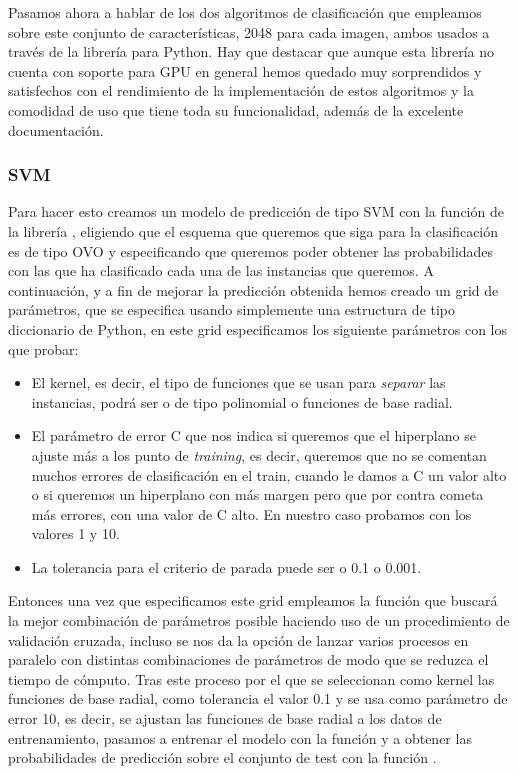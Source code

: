 Pasamos ahora a hablar de los dos algoritmos de clasificación que empleamos sobre este conjunto de características, 2048 para cada imagen,  ambos usados a través de la librería  para Python. Hay que destacar que aunque esta librería no cuenta con soporte para GPU en general hemos quedado muy sorprendidos y satisfechos con el rendimiento de la implementación de estos algoritmos y la comodidad de uso que tiene toda su funcionalidad, además de la excelente documentación.

\subsubsection{SVM}

Para hacer esto creamos un modelo de predicción de tipo SVM con la función  de la librería , eligiendo que el esquema que queremos que siga para la clasificación es de tipo OVO y especificando que queremos poder obtener las probabilidades con las que ha clasificado cada una de las instancias que queremos. A continuación, y a fin de mejorar la predicción obtenida hemos creado un grid de parámetros, que se especifica usando simplemente una estructura de tipo diccionario de Python, en este grid especificamos los siguiente parámetros con los que probar:

\begin{itemize}
\item El kernel, es decir, el tipo de funciones que se usan para \textit{separar} las instancias, podrá ser o de tipo polinomial o funciones de base radial.
\item El parámetro de error C que nos indica si queremos que el hiperplano se ajuste más a los punto de \textit{training}, es decir, queremos que no se comentan muchos errores de clasificación en el train, cuando le damos a C un valor alto o si queremos un hiperplano con más margen pero que por contra cometa más errores, con una valor de C alto. En nuestro caso probamos con los valores 1 y 10.
\item La tolerancia para el criterio de parada puede ser o 0.1 o 0.001.
\end{itemize}

Entonces una vez que especificamos este grid empleamos la función  que buscará la mejor combinación de parámetros posible haciendo uso de un procedimiento de validación cruzada, incluso se nos da la opción de lanzar varios procesos en paralelo con distintas combinaciones de parámetros de modo que se reduzca el tiempo de cómputo. Tras este proceso por el que se seleccionan como kernel las funciones de base radial, como tolerancia el valor 0.1 y se usa como parámetro de error 10, es decir, se ajustan las funciones de base radial a los datos de entrenamiento, pasamos a entrenar el modelo con la función  y a obtener las probabilidades de predicción sobre el conjunto de test con la función .

